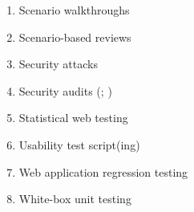 \begin{enumerate}
    \item Scenario walkthroughs \citep[Fig.~4]{Gerrard2000a}
    \item Scenario-based reviews \citepISTQB{}
    \item Security attacks \citepISTQB{}
    \item Security audits (\citealp[p.~40]{IEEE2021}; \citealp[p.~28]{Gerrard2000b})
    \item Statistical web testing \citep[p.~185]{DoğanEtAl2014}
    \item Usability test script(ing) \citepISTQB{}
    \item Web application regression testing \cite[Tab.~21]{DoğanEtAl2014}
    \item White-box unit testing \citep[pp.~345\==346]{SakamotoEtAl2013}
\end{enumerate}

